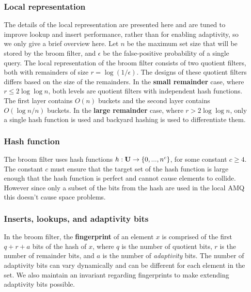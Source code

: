 \documentclass[../paper.tex]{subfiles}
\begin{document}
\subsubsection{Local representation}

The details of the local representation are presented here and are tuned to
improve lookup and insert performance, rather than for enabling adaptivity,
so we only give a brief overview here.
Let $n$ be the maximum set size that will be stored by the broom filter, and $\epsilon$
be the false-positive probability of a single query.
The local representation of the broom filter consists of two quotient filters, both
with remainders of size $r=\log(1/\epsilon)$. The designs of these quotient filters
differs based on the size of the remainders. In the \textbf{small remainder} case,
where $r \leq 2 \log \log n$, both levels are quotient filters with independent hash
functions. The first layer contains $O(n)$ buckets and the second layer contains
$O(\log n/n)$ buckets. In the \textbf{large remainder} case, where $r > 2 \log \log n$,
only a single hash function is used and backyard hashing \cite{backyard-hashing} is used
to differentiate them.

\subsubsection{Hash function}

The broom filter uses hash functions $h : {\bf U} \rightarrow \{0, ..., n^c\}$, for
some constant $c \geq 4$. The constant $c$ must ensure that the target set of the hash
function is large enough that the hash function is perfect and cannot cause elements
to collide. However since only a subset of the bits from the hash are used in the local
AMQ this doesn't cause space problems.


\subsubsection{Inserts, lookups, and adaptivity bits}

In the broom filter, the \textbf{fingerprint} of an element $x$ is comprised of the first
$q + r + a$ bits of the hash of $x$, where $q$ is the number of quotient bits, $r$ is the
number of remainder bits, and $a$ is the number of \textit{adaptivity} bits. The number of
adaptivity bits can vary dynamically and can be different for each element in the set. We
also maintain an invariant regarding fingerprints to make extending adaptivity bits possible.
\end{document}
